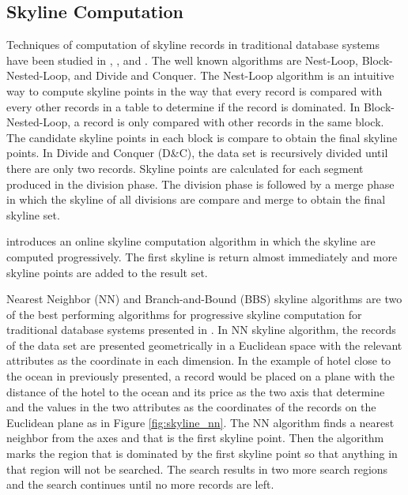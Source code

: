
\subsection{Skyline Computation}

Techniques of computation of skyline records in traditional
database systems have been studied in \cite{skyline_operator},
\cite{shooting_stars}, and \cite{progressive_skyline}. The well
known algorithms are Nest-Loop, Block-Nested-Loop, and Divide and
Conquer. The Nest-Loop algorithm is an intuitive way to compute
skyline points in the way that every record is compared with every
other records in a table to determine if the record is dominated.
In Block-Nested-Loop, a record is only compared with other records
in the same block. The candidate skyline points in each block is
compare to obtain the final skyline points. In Divide and Conquer
(D\&C), the data set is recursively divided until there are only
two records. Skyline points are calculated for each segment
produced in the division phase. The division phase is followed by
a merge phase in which the skyline of all divisions are compare
and merge to obtain the final skyline set.

\cite{shooting_stars} introduces an online skyline computation
algorithm in which the skyline are computed progressively. The
first skyline is return almost immediately and more skyline points
are added to the result set.

Nearest Neighbor (NN) and Branch-and-Bound (BBS) skyline
algorithms are two of the best performing algorithms for
progressive skyline computation for traditional database systems
presented in \cite{progressive_skyline}. In NN skyline algorithm,
the records of the data set are presented geometrically in a
Euclidean space with the relevant attributes as the coordinate in
each dimension. In the example of hotel close to the ocean in
previously presented, a record would be placed on a plane with the
distance of the hotel to the ocean and its price as the two axis
that determine and the values in the two attributes as the
coordinates of the records on the Euclidean plane as in Figure
\ref{fig:skyline_nn}. The NN algorithm finds a nearest neighbor
from the axes and that is the first skyline point. Then the
algorithm marks the region that is dominated by the first skyline
point so that anything in that region will not be searched. The
search results in two more search regions and the search continues
until no more records are left.

